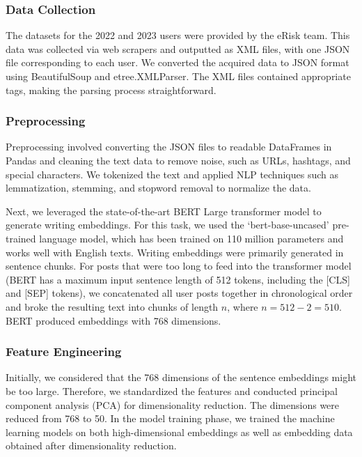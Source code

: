 \documentclass[]{style/ceurart}
\begin{document}
\subsubsection{Data Collection}

The datasets for the 2022 and 2023 users were provided by the eRisk team. This data was collected via web scrapers and outputted as XML files, with one JSON file corresponding to each user. We converted the acquired data to JSON format using BeautifulSoup and etree.XMLParser. The XML files contained appropriate tags, making the parsing process straightforward.

\subsubsection{Preprocessing}

Preprocessing involved converting the JSON files to readable DataFrames in Pandas and cleaning the text data to remove noise, such as URLs, hashtags, and special characters. We tokenized the text and applied NLP techniques such as lemmatization, stemming, and stopword removal to normalize the data.

Next, we leveraged the state-of-the-art BERT Large transformer model to generate writing embeddings. For this task, we used the `bert-base-uncased'\cite{noauthor_google-bertbert-base-uncased_nodate} pre-trained language model, which has been trained on 110 million parameters and works well with English texts. Writing embeddings were primarily generated in sentence chunks. For posts that were too long to feed into the transformer model (BERT has a maximum input sentence length of 512 tokens, including the [CLS] and [SEP] tokens), we concatenated all user posts together in chronological order and broke the resulting text into chunks of length \( n \), where \( n = 512 - 2 = 510 \). BERT produced embeddings with 768 dimensions.

\subsubsection{Feature Engineering}

Initially, we considered that the 768 dimensions of the sentence embeddings might be too large. Therefore, we standardized the features and conducted principal component analysis (PCA) for dimensionality reduction\cite{fodor_survey_2002}. The dimensions were reduced from 768 to 50. In the model training phase, we trained the machine learning models on both high-dimensional embeddings as well as embedding data obtained after dimensionality reduction.
\end{document}
